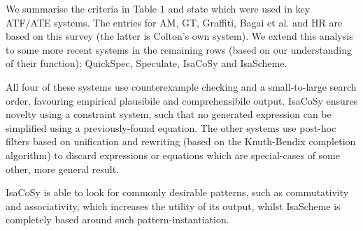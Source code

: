 %
%
%
%


We summarise the criteria in Table 1 and state which were used in key
ATF/ATE systems. The entries for AM, GT, Graffiti, Bagai et al. and HR are based
on this survey (the latter is Colton's own system). We extend this analysis to
some more recent systems in the remaining rows (based on our understanding of
their function): QuickSpec, Speculate, IsaCoSy and IsaScheme.

All four of these systems use counterexample checking and a small-to-large
search order, favouring empirical plausibile and comprehensibile output. IsaCoSy
ensures novelty using a constraint system, such that no generated expression can
be simplified using a previously-found equation. The other systems use post-hoc
filters based on unification and rewriting (based on the Knuth-Bendix completion
algorithm) to discard expressions or equations which are special-cases of some
other, more general result.

IsaCoSy is able to look for commonly desirable patterns, such as commutativity
and associativity, which increases the utility of its output, whilst IsaScheme
is completely based around such pattern-instantiation.

